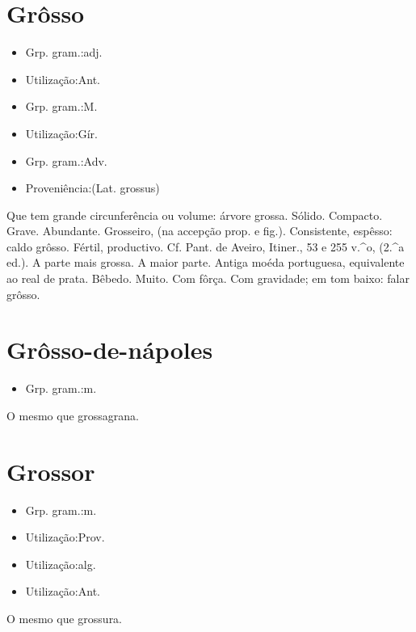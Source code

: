 \section{Grôsso}
\begin{itemize}
\item {Grp. gram.:adj.}
\end{itemize}
\begin{itemize}
\item {Utilização:Ant.}
\end{itemize}
\begin{itemize}
\item {Grp. gram.:M.}
\end{itemize}
\begin{itemize}
\item {Utilização:Gír.}
\end{itemize}
\begin{itemize}
\item {Grp. gram.:Adv.}
\end{itemize}
\begin{itemize}
\item {Proveniência:(Lat. \textunderscore grossus\textunderscore )}
\end{itemize}
Que tem grande circunferência ou volume: \textunderscore árvore grossa\textunderscore .
Sólido.
Compacto.
Grave.
Abundante.
Grosseiro, (na accepção prop. e fig.).
Consistente, espêsso: \textunderscore caldo grôsso\textunderscore .
Fértil, productivo. Cf. Pant. de Aveiro, \textunderscore Itiner.\textunderscore , 53 e 255 v.^o, (2.^a ed.).
A parte mais grossa.
A maior parte.
Antiga moéda portuguesa, equivalente ao real de prata.
Bêbedo.
Muito.
Com fôrça.
Com gravidade; em tom baixo: \textunderscore falar grôsso\textunderscore .
\section{Grôsso-de-nápoles}
\begin{itemize}
\item {Grp. gram.:m.}
\end{itemize}
O mesmo que \textunderscore grossagrana\textunderscore .
\section{Grossor}
\begin{itemize}
\item {Grp. gram.:m.}
\end{itemize}
\begin{itemize}
\item {Utilização:Prov.}
\end{itemize}
\begin{itemize}
\item {Utilização:alg.}
\end{itemize}
\begin{itemize}
\item {Utilização:Ant.}
\end{itemize}
O mesmo que \textunderscore grossura\textunderscore .
